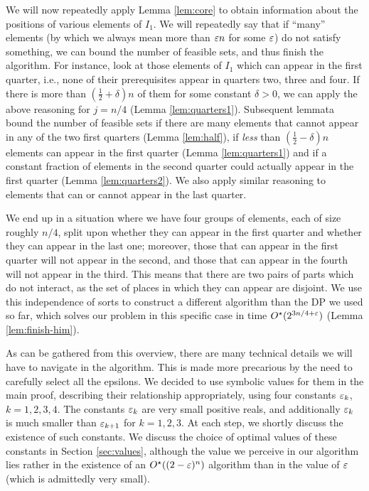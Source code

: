 \documentclass{article}
\theoremstyle{definition}
\begin{document}
We will now repeatedly apply Lemma \ref{lem:core} to obtain information about the
positions of various elements of $I_1$. We will repeatedly say that if ``many'' elements
(by which we always mean more than $\varepsilon n$ for some $\varepsilon$) do not satisfy something,
we can bound the number of feasible sets, and thus finish the algorithm.
For instance, look at those elements of $I_1$ which
can appear in the first quarter, i.e., none of their prerequisites appear in quarters
two, three and four. If there is more than $(\frac{1}{2}+\delta)n$ of them for some constant $\delta > 0$, we can apply the above
reasoning for $j = n\slash 4$ (Lemma \ref{lem:quarters1}).
Subsequent lemmata bound the number of feasible sets if there are many
elements that cannot appear in any of the two first quarters (Lemma \ref{lem:half}),
if {\em less} than $(\frac{1}{2}-\delta)n$ elements can appear in the first
quarter (Lemma \ref{lem:quarters1}) and if a constant fraction of elements
in the second quarter could actually appear in the first quarter
(Lemma \ref{lem:quarters2}). We also apply similar reasoning to elements that
can or cannot appear in the last quarter.

We end up in a situation where we have four groups of elements, each of size
roughly $n \slash 4$, split upon whether they can appear in the first quarter
and whether they can appear in the last one; moreover, those that can appear in
the first quarter will not appear in the second, and those that can appear in
the fourth will not appear in the third. This means that there are two pairs of parts
which do not interact, as the set of places in which they can appear are
disjoint. We use this independence of sorts to construct a different algorithm
than the DP we used so far, which solves our problem in this specific case
in time $O^\star(2^{3n \slash 4 + \varepsilon})$ (Lemma \ref{lem:finish-him}).

As can be gathered from this overview, there are many technical details we
will have to navigate in the algorithm. This is made more precarious by
the need to carefully select all the epsilons. We decided to use symbolic values for
them in the main proof, describing their relationship appropriately, using four constants
$\varepsilon_k$, $k=1,2,3,4$. The constants $\varepsilon_k$ are very small positive reals, and additionally $\varepsilon_k$
is much smaller than $\varepsilon_{k+1}$ for $k=1,2,3$. At each step, we shortly discuss the existence
of such constants. We discuss the choice of optimal values of these constants in Section \ref{sec:values},
although the value we perceive in our algorithm lies rather in the existence
of an $O^\star((2 - \varepsilon)^n)$ algorithm than in the value of $\varepsilon$ (which is admittedly very small).
\end{document}
